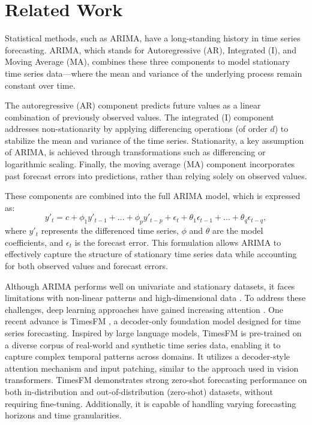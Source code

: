 \documentclass{article}
\theoremstyle{plain}
\theoremstyle{definition}
\theoremstyle{remark}
\begin{document}
\section{Related Work}
Statistical methods, such as ARIMA, have a long-standing history in time series forecasting. ARIMA, which stands for Autoregressive (AR), Integrated (I), and Moving Average (MA), combines these three components to model stationary time series data—where the mean and variance of the underlying process remain constant over time.

The autoregressive (AR) component predicts future values as a linear combination of previously observed values. The integrated (I) component addresses non-stationarity by applying differencing operations (of order $d$) to stabilize the mean and variance of the time series. Stationarity, a key assumption of ARIMA, is achieved through transformations such as differencing or logarithmic scaling. Finally, the moving average (MA) component incorporates past forecast errors into predictions, rather than relying solely on observed values.

These components are combined into the full ARIMA model, which is expressed as:
\begin{equation}
y'_t = c + \phi_1 y'_{t-1} + \dots + \phi_p y'_{t-p} + \epsilon_t + \theta_1 \epsilon_{t-1} + \dots + \theta_q \epsilon_{t-q},
\end{equation}
where $y'_t$ represents the differenced time series, $\phi$ and $\theta$ are the model coefficients, and $\epsilon_t$ is the forecast error. This formulation allows ARIMA to effectively capture the structure of stationary time series data while accounting for both observed values and forecast errors.

Although ARIMA performs well on univariate and stationary datasets, it faces limitations with non-linear patterns and high-dimensional data \cite{stellwagen2013arima}. To address these challenges, deep learning approaches have gained increasing attention \cite{stellwagen2013arima}. One recent advance is TimesFM \cite{das2024decoderonlyfoundationmodeltimeseries}, a decoder-only foundation model designed for time series forecasting. Inspired by large language models, TimesFM is pre-trained on a diverse corpus of real-world and synthetic time series data, enabling it to capture complex temporal patterns across domains. It utilizes a decoder-style attention mechanism and input patching, similar to the approach used in vision transformers. TimesFM demonstrates strong zero-shot forecasting performance on both in-distribution and out-of-distribution (zero-shot) datasets, without requiring fine-tuning. Additionally, it is capable of handling varying forecasting horizons and time granularities.
\end{document}
